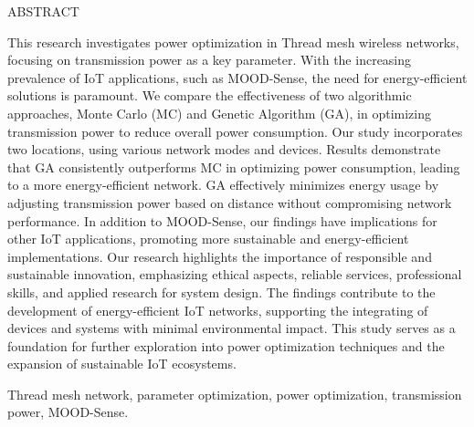 \begin{center}
    ABSTRACT
\vspace{5mm} %
\end{center}

This research investigates power optimization in Thread mesh wireless networks, focusing on transmission power as a key parameter. With the increasing prevalence of IoT applications, such as MOOD-Sense, the need for energy-efficient solutions is paramount. We compare the effectiveness of two algorithmic approaches, Monte Carlo (MC) and Genetic Algorithm (GA), in optimizing transmission power to reduce overall power consumption. Our study incorporates two locations, using various network modes and devices.
Results demonstrate that GA consistently outperforms MC in optimizing power consumption, leading to a more energy-efficient network. GA effectively minimizes energy usage by adjusting transmission power based on distance without compromising network performance. In addition to MOOD-Sense, our findings have implications for other IoT applications, promoting more sustainable and energy-efficient implementations.
Our research highlights the importance of responsible and sustainable innovation, emphasizing ethical aspects, reliable services, professional skills, and applied research for system design. The findings contribute to the development of energy-efficient IoT networks, supporting the integrating of devices and systems with minimal environmental impact. This study serves as a foundation for further exploration into power optimization techniques and the expansion of sustainable IoT ecosystems.

\vspace{5mm} %
 Thread mesh network, parameter optimization, power optimization, transmission power, MOOD-Sense.  %
